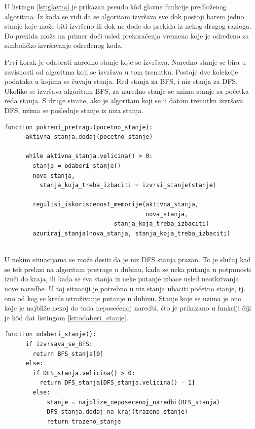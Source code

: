 \documentclass[12pt,oneside]{memoir}
\begin{document}
U listingu \ref{lst:glavna} je prikazan pseudo k\^od glavne funkcije predloženog algoritma. Iz koda se vidi da se algoritam izvršava sve dok postoji barem jedno stanje koje može biti izvršeno ili dok ne dođe do prekida iz nekog drugog razloga. Do prekida može na primer doći usled prekoračenja vremena koje je određeno za simboličko izvršavanje određenog koda. 

Prvi korak je odabrati naredno stanje koje se izvršava. Naredno stanje se bira u zavisnosti od algoritma koji se izvršava u tom trenutku. Postoje dve kolekcije podataka u kojima se čuvaju stanja. Red stanja za BFS, i niz stanja za DFS. Ukoliko se izvršava algoritam BFS, za naredno stanje se uzima stanje sa početka reda stanja. S druge strane, ako je algoritam koji se u datom trenutku izvršava DFS, uzima se poslednje stanje iz niza stanja. 

  \begin{lstlisting}[caption={Pseudo k\^od glavne funckije algoritma},captionpos=b,label={lst:glavna}]
    function pokreni_pretragu(pocetno_stanje):
      aktivna_stanja.dodaj(pocetno_stanje)
            
      while aktivna_stanja.velicina() > 0:
        stanje = odaberi_stanje()
        nova_stanja, 
          stanja_koja_treba_izbaciti = izvrsi_stanje(stanje)
                
        regulisi_iskoriscenost_memorije(aktivna_stanja, 
                                        nova_stanja,
                               stanja_koja_treba_izbaciti)
        azuriraj_stanja(nova_stanja, stanja_koja_treba_izbaciti)
            
    \end{lstlisting}

U nekim situacijama se može desiti da je niz DFS stanja prazan. To je slučaj kad se tek prelazi na algoritam pretrage u dubinu, kada se neka putanja u potpunosti izuči do kraja, ili kada se sva stanja iz neke putanje izbace usled neotkrivanja nove naredbe. U toj situaciji je potrebno u niz stanja ubaciti početno stanje, tj. ono od kog se kreće istraživanje putanje u dubinu. Stanje koje se uzima je ono koje je najbliže nekoj do tada neposećenoj naredbi, što je prikazano u funkciji čiji je k\^od dat listingom \ref{lst:odaberi_stanje}.

\begin{lstlisting}[caption={Pseudo k\^od funkcije za odabir narednog stanja koje se izvršava},captionpos=b,label={lst:odaberi_stanje}]
    function odaberi_stanje():
      if izvrsava_se_BFS:
        return BFS_stanja[0]
      else:
        if DFS_stanja.velicina() > 0:
          return DFS_stanja[DFS_stanja.velicina() - 1]
        else:
            stanje = najblize_neposecenoj_naredbi(BFS_stanja)
            DFS_stanja.dodaj_na_kraj(trazeno_stanje)
            return trazeno_stanje
    \end{lstlisting}
    
\end{document}
